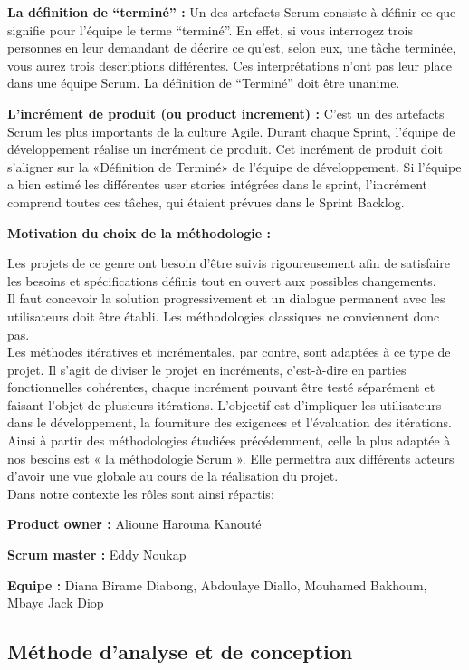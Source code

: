 \documentclass[a4paper, 12pt]{report}
\begin{document}
\begin{itemize}
\textbf{La définition de “terminé” :} Un des artefacts Scrum consiste à définir ce que signifie pour l’équipe le terme “terminé”. En  effet, si vous interrogez trois personnes en leur demandant de décrire  ce qu’est, selon eux, une tâche terminée, vous aurez trois descriptions  différentes. Ces interprétations n’ont pas leur place dans une équipe Scrum. La définition de “Terminé” doit être unanime.  

\textbf{L’incrément de produit (ou product increment) :} C’est un des artefacts Scrum les plus importants de la culture Agile. Durant chaque Sprint, l’équipe de développement réalise un incrément de produit. Cet incrément de produit doit s’aligner sur la «Définition de Terminé» de l’équipe de développement. Si  l’équipe a bien estimé les différentes user stories intégrées dans le  sprint, l’incrément comprend toutes ces tâches, qui étaient prévues dans  le Sprint Backlog.
\end{itemize}
\textbf{Motivation du choix de la méthodologie :}

Les projets de ce genre ont besoin d’être suivis rigoureusement afin de satisfaire les besoins et spécifications définis tout en ouvert aux possibles changements. \\
Il faut concevoir la solution progressivement et un dialogue permanent avec les utilisateurs doit être établi. Les méthodologies classiques ne conviennent donc pas. \\
Les méthodes itératives et incrémentales, par contre, sont adaptées à ce type de projet. Il s’agit de diviser le projet en incréments, c’est-à-dire en parties fonctionnelles cohérentes, chaque incrément pouvant être testé séparément et faisant l’objet de plusieurs itérations. L’objectif est d’impliquer les utilisateurs dans le développement, la fourniture des exigences et l’évaluation des itérations. \\
Ainsi à partir des méthodologies étudiées précédemment, celle la plus adaptée à nos besoins est « la méthodologie Scrum ». Elle permettra aux différents acteurs d’avoir une vue globale au cours de la réalisation du projet. \\
Dans notre contexte les rôles sont ainsi répartis: 

\textbf{Product owner  :}   Alioune Harouna Kanouté

\textbf{Scrum master   :}   Eddy Noukap

\textbf{Equipe :}   Diana Birame Diabong, Abdoulaye Diallo, Mouhamed Bakhoum, Mbaye Jack Diop

\subsection{Méthode d'analyse et de conception}
\end{document}

